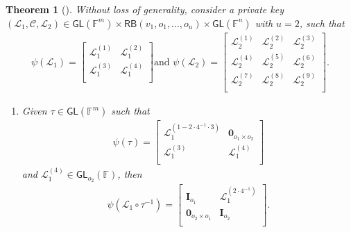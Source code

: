 \documentclass[english]{ufsc-thesis-rn46-2019/ufsc-thesis-rn46-2019}
\newtheorem{theorem}{Theorem}[section]
\theoremstyle{definition}
\begin{document}
\begin{theorem}[{\cite[Thm.~3.6]{Petzoldt:201307}}]\label{thm:eq-keys-rainbow}
  Without loss of generality, consider a private key
  $(\mathcal{L}_{1}, \mathcal{C}, \mathcal{L}_{2})
    \in \mathsf{GL}(\mathbb{F}^{m})
    \times \mathsf{RB}(v_{1}, o_{1}, \dots, o_{u})
    \times \mathsf{GL}(\mathbb{F}^{n})$ with $u = 2$, such that
  \begin{align}
    \psi(\mathcal{L}_{1}) =
    \begin{bmatrix}
      \mathcal{L}_{1}^{(1)} & \mathcal{L}_{1}^{(2)} \\
      \mathcal{L}_{1}^{(3)} & \mathcal{L}_{1}^{(4)} \\
    \end{bmatrix} \text{and }
    \psi(\mathcal{L}_{2}) =
    \begin{bmatrix}
      \mathcal{L}_{2}^{(1)} & \mathcal{L}_{2}^{(2)} & \mathcal{L}_{2}^{(3)} \\
      \mathcal{L}_{2}^{(4)} & \mathcal{L}_{2}^{(5)} & \mathcal{L}_{2}^{(6)} \\
      \mathcal{L}_{2}^{(7)} & \mathcal{L}_{2}^{(8)} & \mathcal{L}_{2}^{(9)} \\
    \end{bmatrix}.
  \end{align}
  \begin{enumerate}
    \item Given $\tau \in \mathsf{GL}(\mathbb{F}^{m})$ such that
      \begin{align}
        \psi(\tau) =
        \begin{bmatrix}
          \mathcal{L}_{1}^{(1 - 2 \cdot 4^{-1} \cdot 3)}
            & \mathbf{0}_{o_{1} \times o_{2}} \\
          \mathcal{L}_{1}^{(3)}
            & \mathcal{L}_{1}^{(4)}           \\
        \end{bmatrix}
      \end{align}
      and $\mathcal{L}_{1}^{(4)} \in \mathsf{GL}_{o_{2}}(\mathbb{F})$, then
      \begin{align}
        \psi(\mathcal{L}_{1} \circ \tau^{-1}) =
        \begin{bmatrix}
          \mathbf{I}_{o_{1}}
            & \mathcal{L}_{1}^{(2 \cdot 4^{-1})} \\
          \mathbf{0}_{o_{2} \times o_{1}}
            & \mathbf{I}_{o_{2}}                 \\
        \end{bmatrix}.
      \end{align}

\end{enumerate}
\end{theorem}
\end{document}
